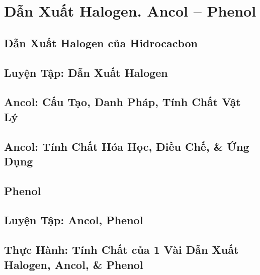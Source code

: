 \documentclass[oneside]{book}
\numberwithin{equation}{section}
\begin{document}
\chapter{Dẫn Xuất Halogen. Ancol -- Phenol}

\section{Dẫn Xuất Halogen của Hidrocacbon}


\section{Luyện Tập: Dẫn Xuất Halogen}


\section{Ancol: Cấu Tạo, Danh Pháp, Tính Chất Vật Lý}


\section{Ancol: Tính Chất Hóa Học, Điều Chế, \& Ứng Dụng}


\section{Phenol}


\section{Luyện Tập: Ancol, Phenol}


\section{Thực Hành: Tính Chất của 1 Vài Dẫn Xuất Halogen, Ancol, \& Phenol}
\end{document}
